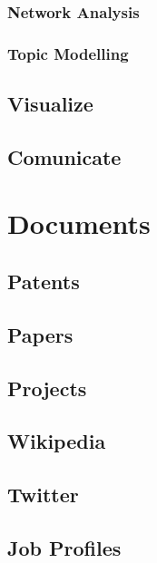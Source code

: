 \documentclass[]{book}
\begin{document}
\subsubsection{Network Analysis}\label{network-analysis}

\subsubsection{Topic Modelling}\label{topic-modelling}

\subsection{Visualize}\label{visualize}

\subsection{Comunicate}\label{comunicate}

\section{Documents}\label{documents}

\subsection{Patents}\label{patents}

\subsection{Papers}\label{papers}

\subsection{Projects}\label{projects}

\subsection{Wikipedia}\label{wikipedia}

\subsection{Twitter}\label{twitter}

\subsection{Job Profiles}\label{job-profiles}
\end{document}
